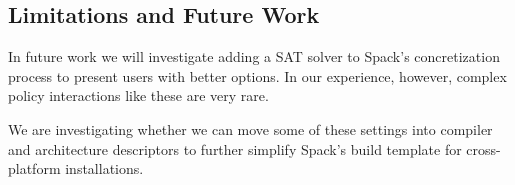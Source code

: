 
\subsection{Limitations and Future Work}

In future work we will investigate adding a SAT solver to Spack's
concretization process to present users with better options.  In our
experience, however, complex policy interactions like these are very
rare.

We are investigating whether we can move some of these settings into compiler and
architecture descriptors to further simplify Spack's build template for cross-platform
installations.